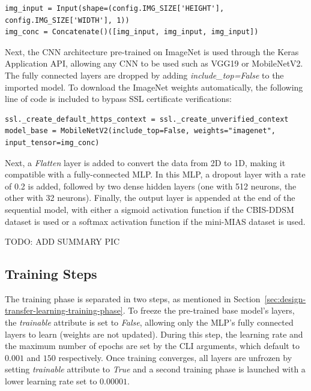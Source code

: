\begin{lstlisting}[numbers=none]
img_input = Input(shape=(config.IMG_SIZE['HEIGHT'], config.IMG_SIZE['WIDTH'], 1))
img_conc = Concatenate()([img_input, img_input, img_input])
\end{lstlisting}

Next, the CNN architecture pre-trained on ImageNet is used through the Keras Application API, allowing any CNN to be used such as VGG19 or MobileNetV2. The fully connected layers are dropped by adding \textit{include\_top=False} to the imported model. To download the ImageNet weights automatically, the following line of code is included to bypass SSL certificate verifications:

\begin{lstlisting}[numbers=none]
ssl._create_default_https_context = ssl._create_unverified_context
model_base = MobileNetV2(include_top=False, weights="imagenet", input_tensor=img_conc)
\end{lstlisting}

Next, a \textit{Flatten} layer is added to convert the data from 2D to 1D, making it compatible with a fully-connected MLP. In this MLP, a dropout layer with a rate of 0.2 is added, followed by two dense hidden layers (one with 512 neurons, the other with 32 neurons). Finally, the output layer is appended at the end of the sequential model, with either a sigmoid activation function if the CBIS-DDSM dataset is used or a softmax activation function if the mini-MIAS dataset is used.

TODO: ADD SUMMARY PIC



\subsection{Training Steps} 

The training phase is separated in two steps, as mentioned in Section~\ref{sec:design-transfer-learning-training-phase}. To freeze the pre-trained base model's layers, the \textit{trainable} attribute is set to \textit{False}, allowing only the MLP's fully connected layers to learn (weights are not updated). During this step, the learning rate and the maximum number of epochs are set by the CLI arguments, which default to $0.001$ and $150$ respectively. Once training converges, all layers are unfrozen by setting \textit{trainable} attribute to \textit{True} and a second training phase is launched with a lower learning rate set to $0.00001$.\\

